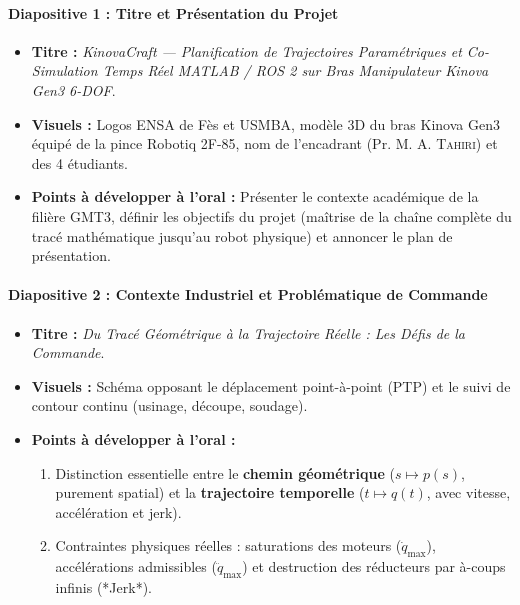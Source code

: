 \documentclass[11pt,a4paper]{report}
\begin{document}
\paragraph{Diapositive 1 : Titre et Présentation du Projet}
\begin{itemize}
    \item \textbf{Titre :} \textit{KinovaCraft — Planification de Trajectoires Paramétriques et Co-Simulation Temps Réel MATLAB / ROS 2 sur Bras Manipulateur Kinova Gen3 6-DOF}.
    \item \textbf{Visuels :} Logos ENSA de Fès et USMBA, modèle 3D du bras Kinova Gen3 équipé de la pince Robotiq 2F-85, nom de l'encadrant (Pr. M. A. \textsc{Tahiri}) et des 4 étudiants.
    \item \textbf{Points à développer à l'oral :} Présenter le contexte académique de la filière GMT3, définir les objectifs du projet (maîtrise de la chaîne complète du tracé mathématique jusqu'au robot physique) et annoncer le plan de présentation.
\end{itemize}

\paragraph{Diapositive 2 : Contexte Industriel et Problématique de Commande}
\begin{itemize}
    \item \textbf{Titre :} \textit{Du Tracé Géométrique à la Trajectoire Réelle : Les Défis de la Commande}.
    \item \textbf{Visuels :} Schéma opposant le déplacement point-à-point (PTP) et le suivi de contour continu (usinage, découpe, soudage).
    \item \textbf{Points à développer à l'oral :}
    \begin{enumerate}
        \item Distinction essentielle entre le \textbf{chemin géométrique} ($s \mapsto p(s)$, purement spatial) et la \textbf{trajectoire temporelle} ($t \mapsto q(t)$, avec vitesse, accélération et jerk).
        \item Contraintes physiques réelles : saturations des moteurs ($\dot{q}_{\max}$), accélérations admissibles ($\ddot{q}_{\max}$) et destruction des réducteurs par à-coups infinis (*Jerk*).
    \end{enumerate}
\end{itemize}
\end{document}
